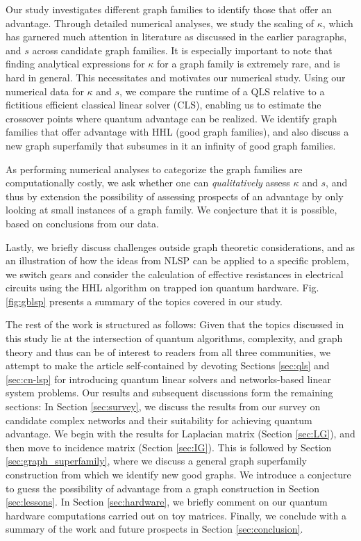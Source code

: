 \documentclass[%
 reprint,
 superscriptaddress,
 amsmath,amssymb,
 aps,
 pra,
floatfix,
nofootinbib,
]{revtex4-2}
\theoremstyle{definition}
\theoremstyle{remark}
\begin{document}
Our study investigates different graph families to identify those that offer an advantage. Through detailed numerical analyses, we study the scaling of $\kappa$, which has garnered much attention in literature as discussed in the earlier paragraphs, and $s$ across candidate graph families. It is especially important to note that finding analytical expressions for $\kappa$ for a graph family is extremely rare, and is hard in general. This necessitates and motivates our numerical study. Using our numerical data for $\kappa$ and $s$, we compare the runtime of a QLS relative to a fictitious efficient classical linear solver (CLS), enabling us to estimate the crossover points where quantum advantage can be realized. We identify graph families that offer advantage with HHL (good graph families), and also discuss a new graph superfamily that subsumes in it an infinity of good graph families. 

As performing numerical analyses to categorize the graph families are computationally costly, we ask whether one can \textit{qualitatively} assess $\kappa$ and $s$, and thus by extension the possibility of assessing prospects of an advantage by only looking at small instances of a graph family. We conjecture that it is possible, based on conclusions from our data. 

Lastly, we briefly discuss challenges outside graph theoretic considerations, and as an illustration of how the ideas from NLSP can be applied to a specific problem, we switch gears and consider the calculation of effective resistances in electrical circuits using the HHL algorithm on trapped ion quantum hardware. Fig. \ref{fig:gblsp} presents a summary of the topics covered in our study. 

The rest of the work is structured as follows: Given that the topics discussed in this study lie at the intersection of quantum algorithms, complexity, and graph theory and thus can be of interest to readers from all three communities, we attempt to make the article self-contained by devoting Sections \ref{sec:qls} and \ref{sec:cn-lsp} for introducing quantum linear solvers and networks-based linear system problems. Our results and subsequent discussions form the remaining sections: In Section \ref{sec:survey}, we discuss the results from our survey on candidate complex networks and their suitability for achieving quantum advantage. We begin with the results for Laplacian matrix (Section \ref{sec:LG}), and then move to incidence matrix (Section \ref{sec:IG}). This is followed by Section \ref{sec:graph_superfamily}, where we discuss a general graph superfamily construction from which we identify new good graphs. We introduce a conjecture to guess the possibility of advantage from a graph construction in Section \ref{sec:lessons}. In Section \ref{sec:hardware}, we briefly comment on our quantum hardware computations carried out on toy matrices. Finally, we conclude with a summary of the work and future prospects in Section \ref{sec:conclusion}. 
\end{document}
